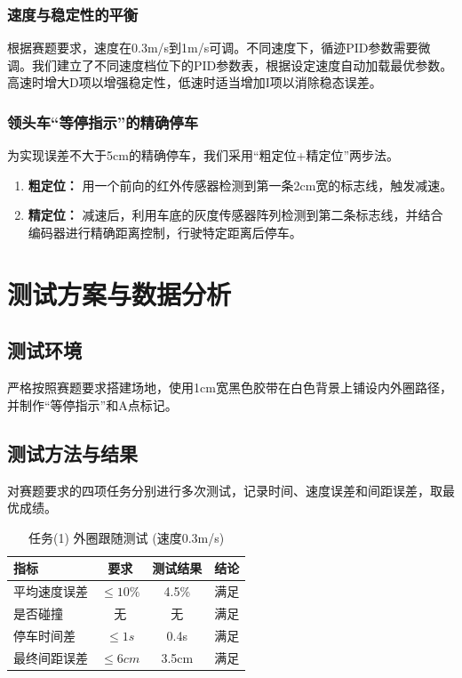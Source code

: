 \documentclass[UTF8]{ctexart}
\begin{document}
\subsubsection{速度与稳定性的平衡}
根据赛题要求，速度在0.3m/s到1m/s可调。不同速度下，循迹PID参数需要微调。我们建立了不同速度档位下的PID参数表，根据设定速度自动加载最优参数。高速时增大D项以增强稳定性，低速时适当增加I项以消除稳态误差。

\subsubsection{领头车``等停指示''的精确停车}
为实现误差不大于5cm的精确停车，我们采用``粗定位+精定位''两步法。
\begin{enumerate}
    \item \textbf{粗定位：} 用一个前向的红外传感器检测到第一条2cm宽的标志线，触发减速。
    \item \textbf{精定位：} 减速后，利用车底的灰度传感器阵列检测到第二条标志线，并结合编码器进行精确距离控制，行驶特定距离后停车。
\end{enumerate}

\section{测试方案与数据分析}

\subsection{测试环境}
严格按照赛题要求搭建场地，使用1cm宽黑色胶带在白色背景上铺设内外圈路径，并制作``等停指示''和A点标记。

\subsection{测试方法与结果}
对赛题要求的四项任务分别进行多次测试，记录时间、速度误差和间距误差，取最优成绩。

\begin{table}[H]
    \centering
    \caption{任务(1) 外圈跟随测试 (速度0.3m/s)}
    \begin{tabular}{lccc}
        \toprule
        指标 & 要求 & 测试结果 & 结论 \\
        \midrule
        平均速度误差 & $\le 10\%$ & 4.5\% & 满足 \\
        是否碰撞 & 无 & 无 & 满足 \\
        停车时间差 & $\le 1s$ & 0.4s & 满足 \\
        最终间距误差 & $\le 6cm$ & 3.5cm & 满足 \\
        \bottomrule
    \end{tabular}
\end{table}
\end{document}
